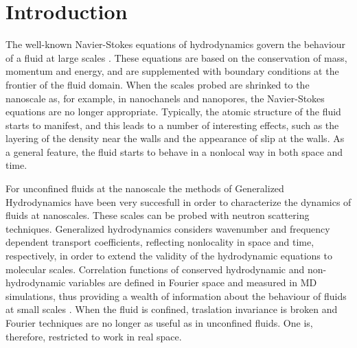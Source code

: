 \documentclass[b5paper,openright,10pt]{book}
\begin{document}
\section{Introduction}

The well-known Navier-Stokes equations of hydrodynamics govern the behaviour of a fluid at large scales \cite{Bird1987, Clarke1995,Rubbert1968}. These equations are based on the conservation of mass, momentum and energy, and are supplemented with
boundary conditions  at the  frontier of the  fluid domain. When the
scales  probed are  shrinked  to  the nanoscale  as,  for example,  in
nanochanels and  nanopores, the Navier-Stokes equations  are no longer
appropriate. Typically,  the atomic structure  of the fluid  starts to
manifest, and this  leads to a number of interesting  effects, such as
the layering of the density near  the walls and the appearance of slip
at the walls.  As a general feature,  the fluid starts to  behave in a
nonlocal way  in both space and  time.  

For unconfined fluids  at the
nanoscale the methods of Generalized Hydrodynamics \cite{Boon1980,Mountain1977,
 Hansen2013,Alley1984}  have been very succesfull  in order
to  characterize the  dynamics of  fluids  at nanoscales. These scales can  be
probed with neutron scattering techniques.  Generalized hydrodynamics
considers wavenumber  and frequency dependent  transport coefficients,
reflecting nonlocality in  space and time, respectively,  in order to
extend the validity of the hydrodynamic equations to molecular scales.
Correlation functions of conserved hydrodynamic  and non-hydrodynamic
variables are defined in Fourier space and measured in MD simulations,
thus providing a  wealth of information about the  behaviour of fluids
at small scales \cite{Chung1969,DeSchepper1988,Khayat1989}.
When  the  fluid is  confined,  traslation  invariance is  broken  and
Fourier  techniques  are   no  longer  as  useful   as  in  unconfined
fluids. One is, therefore, restricted to  work in real space.
\end{document}
